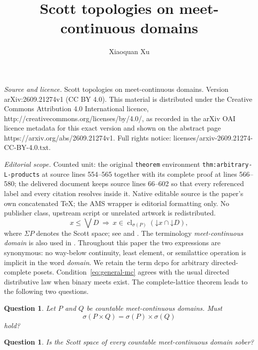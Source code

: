 \documentclass[10pt,a4paper]{amsart}
\newtheorem{question}[theorem]{Question}
\numberwithin{equation}{section}
\newcommand{\down}[1]{\mathord{\downarrow}#1}
\newcommand{\Sc}{\sigma}
\newcommand{\Sig}{\Sigma}
\newcommand{\cl}{\operatorname{cl}}
\begin{document}
\title[Scott topologies on meet-continuous domains]{Scott topologies on meet-continuous domains}
\author{Xiaoquan Xu}
\date{}
\maketitle
\noindent\emph{Source and licence.} Scott topologies on meet-continuous domains. Version arXiv:2609.21274v1 (CC BY 4.0). This material is distributed under the Creative Commons Attribution 4.0 International licence, http://creativecommons.org/licenses/by/4.0/, as recorded in the arXiv OAI licence metadata for this exact version and shown on the abstract page https://arxiv.org/abs/2609.21274v1. Full rights notice: licenses/arxiv-2609.21274-CC-BY-4.0.txt.\par\smallskip
\noindent\textit{Editorial scope.} Counted unit: the original \texttt{theorem} environment \texttt{thm:arbitrary-L-products} at source lines 554--565 together with its complete proof at lines 566--580; the delivered document keeps source lines 66--602 so that every referenced label and every citation resolves inside it. Native editable source is the paper's own concatenated TeX; the AMS wrapper is editorial formatting only. No publisher class, upstream script or unrelated artwork is redistributed.
\begin{equation}\label{eq:general-mc}
 x\le\bigvee D
 ~\Longrightarrow~
 x\in\cl_{\sigma(P)}(\down x\cap\down D),
\end{equation}
where $\Sig P$ denotes the Scott space; see \cite{KouLiuLuo} and \cite[Section~3]{JiaJungLi}. The terminology \emph{meet-continuous domain} is also used in \cite{LyuKou}. Throughout this paper the two expressions are synonymous: no way-below continuity, least element, or semilattice operation is implicit in the word \emph{domain}. We retain the term dcpo for arbitrary directed-complete posets. Condition~\eqref{eq:general-mc} agrees with the usual directed distributive law when binary meets exist. The complete-lattice theorem leads to the following two questions.

\begin{question}\label{quest:mc-dcpo-product}
Let $P$ and $Q$ be countable meet-continuous domains. Must
\[
 \Sc(P\times Q)=\Sc(P)\times\Sc(Q)
\]
hold?
\end{question}

\begin{question}\label{quest:mc-dcpo-sober}
Is the Scott space of every countable meet-continuous domain sober?
\end{question}
\end{document}
